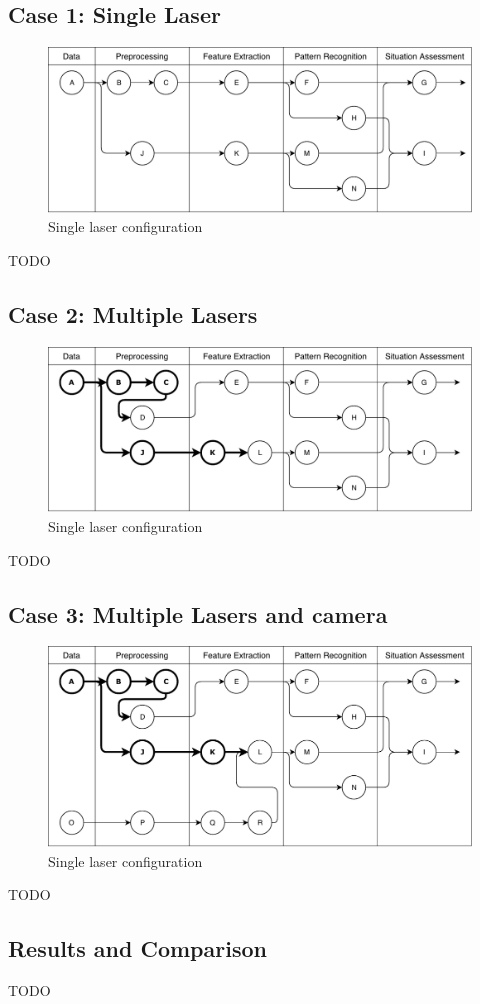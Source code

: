 \subsection{Case 1: Single Laser}

\begin{figure}[ht!]
\centering
\includegraphics[scale=0.7]{fig/4/test_configuration1.pdf}
\caption{Single laser configuration}
\label{tconf1}
\end{figure}

TODO


\subsection{Case 2: Multiple Lasers}

\begin{figure}[ht!]
\centering
\includegraphics[scale=0.7]{fig/4/test_configuration2.pdf}
\caption{Single laser configuration}
\label{tconf2}
\end{figure}

TODO

\subsection{Case 3: Multiple Lasers and camera}

\begin{figure}[ht!]
\centering
\includegraphics[scale=0.7]{fig/4/test_configuration3.pdf}
\caption{Single laser configuration}
\label{tconf3}
\end{figure}

TODO

\subsection{Results and Comparison}

TODO